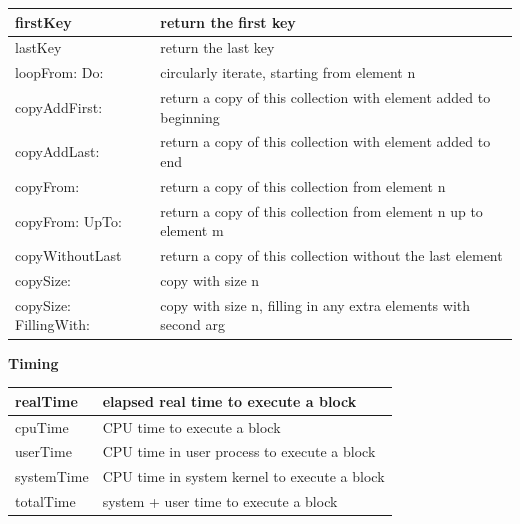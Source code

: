 \documentclass[letterpaper,10pt,english]{sphinxmanual}
\begin{document}
\begin{tabulary}{\linewidth}{p{5cm} p{10cm}}
\hline

firstKey
 & 
return the first key
\\\hline

lastKey
 & 
return the last key
\\\hline

loopFrom: Do:
 & 
circularly iterate, starting from element n
\\\hline

copyAddFirst:
 & 
return a copy of this collection with element added to beginning
\\\hline

copyAddLast:
 & 
return a copy of this collection with element added to end
\\\hline

copyFrom:
 & 
return a copy of this collection from element n
\\\hline

copyFrom: UpTo:
 & 
return a copy of this collection from element n up to element m
\\\hline

copyWithoutLast
 & 
return a copy of this collection without the last element
\\\hline

copySize:
 & 
copy with size n
\\\hline

copySize: FillingWith:
 & 
copy with size n, filling in any extra elements with second arg
\\\hline
\end{tabulary}


\textbf{Timing}

\begin{tabulary}{\linewidth}{p{5cm} p{10cm}}
\hline

realTime
 & 
elapsed real time to execute a block
\\\hline

cpuTime
 & 
CPU time to execute a block
\\\hline

userTime
 & 
CPU time in user process to execute a block
\\\hline

systemTime
 & 
CPU time in system kernel to execute a block
\\\hline

totalTime
 & 
system + user time to execute a block
\\\hline
\end{tabulary}
\end{document}
